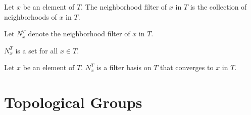 \documentclass[english,11pt]{article}
\newcommand{\neigh}[2]{N^{#2}_{#1}}
\begin{document}
\begin{forthel}
\begin{definition} Let $x$ be an element of $T$.
The neighborhood filter of $x$ in $T$ is the collection of neighborhoods of $x$ in $T$.
\end{definition}

Let $\neigh{x}{T}$ denote the neighborhood filter of $x$ in $T$.

\begin{lemma}
$\neigh{x}{T}$ is a set for all $x \in T$.
\end{lemma}

\begin{lemma}
Let $x$ be an element of $T$. $\neigh{x}{T}$ is a filter basis on $T$ that converges
to $x$ in $T$.
\end{lemma}

\end{forthel}

\section{Topological Groups}
\end{document}
